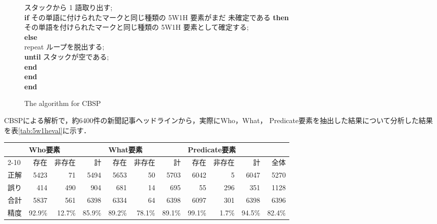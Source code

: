 \begin{figure}[ptb]
\begin{center}
\begin{tabbing}
      スタックから 1 語取り出す;\\
      {\bf if} その単語に付けられたマークと同じ種類の 5W1H 要素がまだ
      未確定である {\bf then}\+\\
      その単語を付けられたマークと同じ種類の 5W1H 要素として確定する;\-\\
      {\bf else}\+\\
      repeat ループを脱出する;\-\-\\
      {\bf until} スタックが空である;\-\\
      {\bf end}\-\\
      {\bf end}\-\\
      {\bf end}
    \end{tabbing}
    \caption{The algorithm for CBSP}
    \label{fig:cbsp}
  \end{center}
\end{figure}

CBSPによる解析で，約6400件の新聞記事ヘッドラインから，実際にWho，What，
Predicate要素を抽出した結果について分析した結果を表\ref{tab:5w1heval}に示す．
\begin{table*}[tbp]
  \begin{center}
    \caption{Who, What, Predicateの各要素および全体での抽出結果の評価}
    \vspace*{10pt}
    \small
    \begin{tabular}{lrrrrrrrrrr}
      \hline
      & \multicolumn{3}{l}{Who要素}
      & \multicolumn{3}{l}{What要素}
      & \multicolumn{3}{l}{Predicate要素} & \\ \cline{2-10}
      & 存在 & 非存在 & 計
      & 存在 & 非存在 & 計
      & 存在 & 非存在 & 計 & 全体 \\ \hline
      正解 & 5423 & 71 & 5494 & 5653 & 50 & 5703
      & 6042 & 5 & 6047 & 5270 \\
      誤り & 414 & 490 & 904 & 681 & 14 & 695
      & 55 & 296 & 351 & 1128 \\ \hline
      合計 & 5837 & 561 & 6398 & 6334 & 64 & 6398
      & 6097 & 301 & 6398 & 6396 \\ \hline
      精度 & 92.9\% & 12.7\% & 85.9\% & 89.2\% & 78.1\% & 89.1\%
      & 99.1\% & 1.7\% & 94.5\% & 82.4\% \\ \hline
    \end{tabular}
    \label{tab:5w1heval}
  \end{center}
\end{table*}

